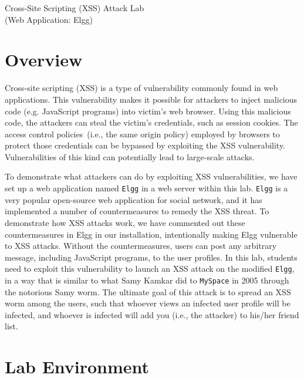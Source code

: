 




\begin{center}
{\LARGE Cross-Site Scripting (XSS) Attack Lab}
\vspace{0.1in}\\
{\Large (Web Application: Elgg)}
\end{center}
\copyrightnotice

\section{Overview}

Cross-site scripting (XSS) is a type of vulnerability commonly found
in web applications.  This vulnerability makes it possible for
attackers to inject malicious code (e.g. JavaScript programs) into victim's
web browser. Using this malicious code, the attackers can steal the
victim's credentials, such as session cookies.  The access control 
policies~(i.e., the same origin policy) employed by browsers to protect
those credentials can be bypassed by exploiting the XSS vulnerability.
Vulnerabilities of this kind can potentially lead to large-scale
attacks.

To demonstrate what attackers can do by exploiting XSS
vulnerabilities, we have set up a web application named 
{\tt Elgg} in a web server within this lab.
{\tt Elgg} is a very popular open-source web application for
social network, and it has implemented a number of countermeasures 
to remedy the XSS threat. To demonstrate how XSS attacks work, we 
have commented out these countermeasures in Elgg in our installation, 
intentionally making Elgg vulnerable to XSS attacks.  
Without the countermeasures, users 
can post any arbitrary message, including JavaScript
programs, to the user profiles.  
In this lab, students need to exploit this vulnerability to 
launch an XSS attack on the modified {\tt Elgg}, in a way that is 
similar to what Samy Kamkar
did to {\tt MySpace} in 2005 through the notorious Samy worm. 
The ultimate goal of this attack is to spread an XSS worm among the users,
such that whoever views an infected user profile will be infected,
and whoever is infected will add you (i.e., the attacker) to 
his/her friend list. 



\section{Lab Environment}

